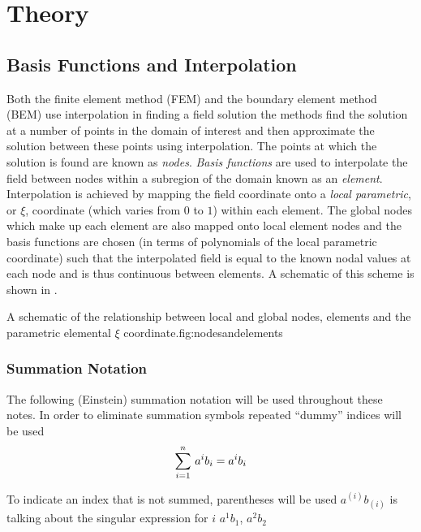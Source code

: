 \clearemptydoublepage
\chapter{Theory}
\label{cha:theory}

\section{Basis Functions and Interpolation}
\label{sec:basisfunctions}

Both the finite element method (FEM) and the boundary element method (BEM) use
interpolation in finding a field solution \ie the methods find the solution at
a number of points in the domain of interest and then approximate the solution
between these points using interpolation. The points at which the solution is
found are known as \emph{nodes}. \emph{Basis functions} are used to
interpolate the field between nodes within a subregion of the domain known as
an \emph{element}. Interpolation is achieved by mapping the field coordinate
onto a \emph{local parametric}, or $\xi$, coordinate (which varies from $0$ to
$1$) within each element. The global nodes which make up each element are also
mapped onto local element nodes and the basis functions are chosen (in terms
of polynomials of the local parametric coordinate) such that the interpolated
field is equal to the known nodal values at each node and is thus continuous
between elements. A schematic of this
scheme is shown in .

 {A schematic of the relationship between local
  and global nodes, elements and the parametric elemental $\xi$
  coordinate.}{fig:nodesandelements}


\subsection{Summation Notation}
\label{subsec:summation notation}

The following (Einstein) summation notation will be used throughout these notes. In order to
eliminate summation symbols repeated ``dummy'' indices will be used \ie
\begin{equation}
    \displaystyle\sum_{i=1}^{n} \,a^{i}b_{i} =a^{i}b_{i}
\end{equation}

To indicate an index that is not summed, parentheses will be used
\ie $a^{(i)}b_{(i)}$ is talking about the singular expression for $i$ \eg
$a^{1}b_{1}$, $a^{2}b_{2}$ \etc

